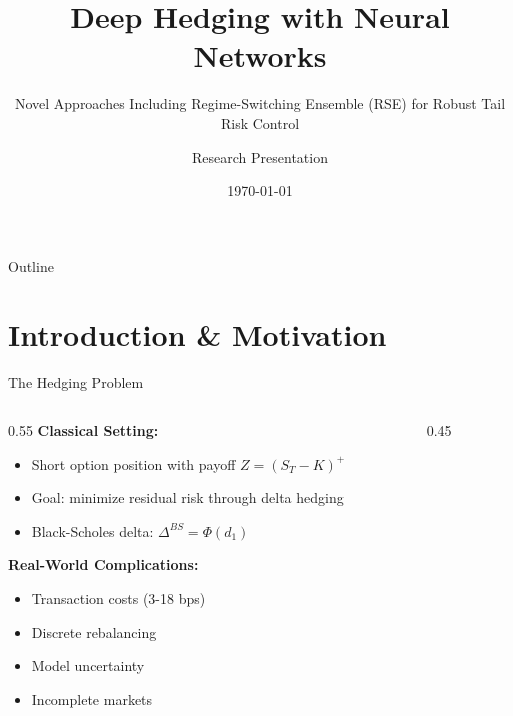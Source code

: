 \documentclass[aspectratio=169,11pt]{beamer}
\title[Deep Hedging]{\textbf{Deep Hedging with Neural Networks}}
\subtitle{Novel Approaches Including Regime-Switching Ensemble (RSE) for Robust Tail Risk Control}
\author{Research Presentation}
\institute{Department of Financial Mathematics}
\date{\today}
\begin{document}
\begin{frame}
\titlepage
\end{frame}

\begin{frame}{Outline}
\tableofcontents
\end{frame}

\section{Introduction \& Motivation}

\begin{frame}{The Hedging Problem}
\begin{columns}
\begin{column}{0.55\textwidth}
\textbf{Classical Setting:}
\begin{itemize}
    \item Short option position with payoff $Z = (S_T - K)^+$
    \item Goal: minimize residual risk through delta hedging
    \item Black-Scholes delta: $\Delta^{BS} = \Phi(d_1)$
\end{itemize}

\vspace{0.3cm}
\textbf{Real-World Complications:}
\begin{itemize}
    \item Transaction costs (3-18 bps)
    \item Discrete rebalancing
    \item Model uncertainty
    \item Incomplete markets
\end{itemize}
\end{column}
\begin{column}{0.45\textwidth}
\end{column}
\end{columns}
\end{frame}
\end{document}
